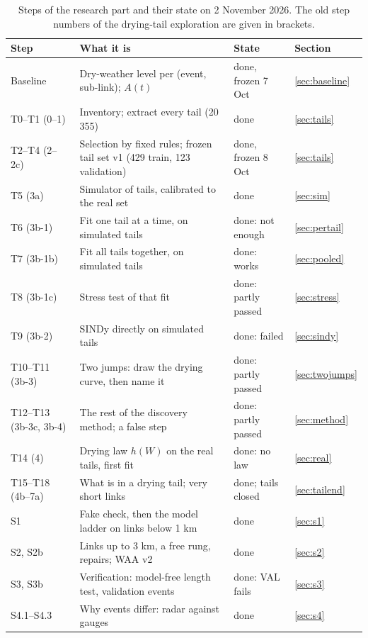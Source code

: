 \documentclass[11pt,a4paper]{article}
\begin{document}
\begin{table}[H]
\centering
\caption{Steps of the research part and their state on 2 November 2026. The old step numbers of the drying-tail
exploration are given in brackets.}
\label{tab:status}
\small
\begin{tabularx}{\linewidth}{@{}l Y l l@{}}
\toprule
\textbf{Step} & \textbf{What it is} & \textbf{State} & \textbf{Section} \\
\midrule
Baseline & Dry-weather level per (event, sub-link); $A(t)$ & done, frozen 7 Oct & \ref{sec:baseline} \\
T0--T1 (0--1) & Inventory; extract every tail (20\,355) & done & \ref{sec:tails} \\
T2--T4 (2--2c) & Selection by fixed rules; frozen tail set v1 (429 train, 123 validation) & done, frozen 8 Oct & \ref{sec:tails} \\
T5 (3a) & Simulator of tails, calibrated to the real set & done & \ref{sec:sim} \\
T6 (3b-1) & Fit one tail at a time, on simulated tails & done: not enough & \ref{sec:pertail} \\
T7 (3b-1b) & Fit all tails together, on simulated tails & done: works & \ref{sec:pooled} \\
T8 (3b-1c) & Stress test of that fit & done: partly passed & \ref{sec:stress} \\
T9 (3b-2) & SINDy directly on simulated tails & done: failed & \ref{sec:sindy} \\
T10--T11 (3b-3) & Two jumps: draw the drying curve, then name it & done: partly passed & \ref{sec:twojumps} \\
T12--T13 (3b-3c, 3b-4) & The rest of the discovery method; a false step & done: partly passed & \ref{sec:method} \\
T14 (4) & Drying law $h(W)$ on the real tails, first fit & done: no law & \ref{sec:real} \\
T15--T18 (4b--7a) & What is in a drying tail; very short links & done; tails closed & \ref{sec:tailend} \\
S1 & Fake check, then the model ladder on links below 1 km & done & \ref{sec:s1} \\
S2, S2b & Links up to 3 km, a free rung, repairs; WAA v2 & done & \ref{sec:s2} \\
S3, S3b & Verification: model-free length test, validation events & done: VAL fails & \ref{sec:s3} \\
S4.1--S4.3 & Why events differ: radar against gauges & done & \ref{sec:s4} \\

\end{tabularx}
\end{table}
\end{document}
